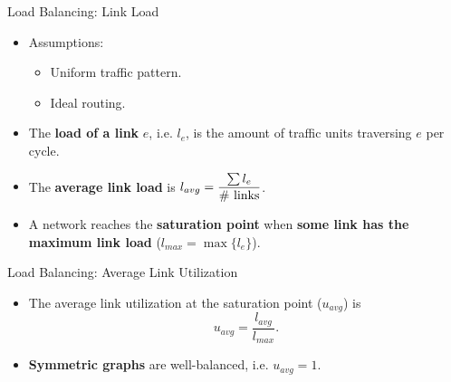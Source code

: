 \begin{frame}[t]{Load Balancing: Link Load}

\begin{itemize}
\item Assumptions:

\begin{itemize}
\item Uniform traffic pattern.
\item Ideal routing.
\end{itemize}
\item The \textbf{load of a link} $e$, i.e. $l_{e}$, is the amount of traffic units traversing $e$ per cycle.
\item The \textbf{average link load} is $\displaystyle l_{avg}=\frac{\sum{l_e}}{\#\textnormal{ links}}$.
\item A network reaches the \textbf{saturation point} when \textbf{some link has the maximum link load} ($l_{max}= \max\{l_e\}$).
\end{itemize}
\end{frame}
\begin{frame}[t]{Load Balancing: Average Link Utilization }
\begin{itemize}
\item The average link utilization at the saturation point ($u_{avg}$) is
$$\displaystyle u_{avg}=\frac{l_{avg}}{l_{max}}.$$
\item \textbf{Symmetric graphs} are well-balanced, i.e. $u_{avg}=1$.
\end{itemize}
\end{frame}

